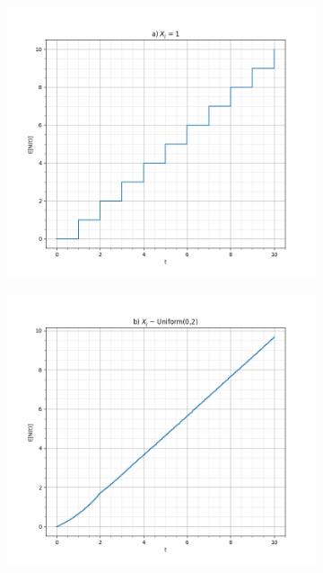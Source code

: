 \documentclass[a4paper]{article}
\begin{document}
\begin{itemize}
\begin{figure} [t]
\begin{subfigure}[b]{0.45\textwidth}
                \includegraphics[width=1\linewidth]{src/a.png}
            \end{subfigure}
            \begin{subfigure}[b]{0.45\textwidth}
                \includegraphics[width=1\linewidth]{src/b.png}
            \end{subfigure}
            \\
            \begin{subfigure}[b]{0.45\textwidth}

\end{subfigure}
\end{figure}
\end{itemize}
\end{document}
